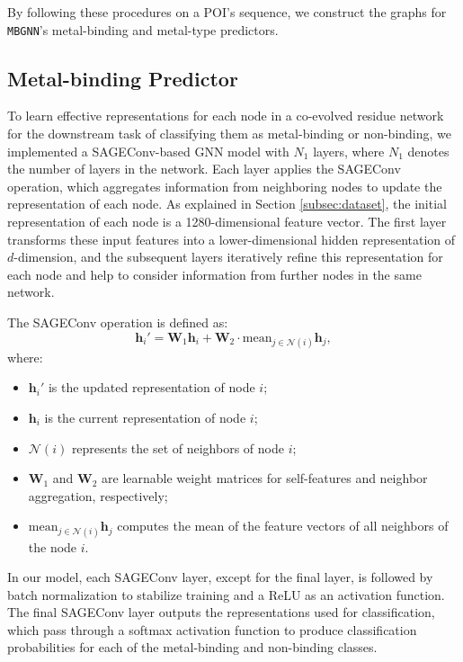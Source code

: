 \documentclass[letterpaper, 10 pt, conference]{ieeeconf}
\begin{document}
By following these procedures on a POI's sequence, we construct the graphs for \texttt{MBGNN}'s metal-binding and metal-type predictors.

\subsection{Metal-binding Predictor}
\label{subsec:mbp}
To learn effective representations for each node in a co-evolved residue network for the downstream task of classifying them as metal-binding or non-binding, we implemented a SAGEConv-based GNN model\cite{hamilton2017inductive} with $N_1$ layers, where $N_1$ denotes the number of layers in the network. Each layer applies the SAGEConv operation, which aggregates information from neighboring nodes to update the representation of each node. As explained in Section \ref{subsec:dataset}, the initial representation of each node is a 1280-dimensional feature vector. The first layer transforms these input features into a lower-dimensional hidden representation of $d$-dimension, and the subsequent layers iteratively refine this representation for each node and help to consider information from further nodes in the same network.

The SAGEConv operation is defined as:
\begin{equation}
    \mathbf{h}_i' = \mathbf{W}_1 \mathbf{h}_i + \mathbf{W}_2 \cdot \text{mean}_{j \in \mathcal{N}(i)} \mathbf{h}_j,
\end{equation}
where:  
\begin{itemize}
    \item \(\mathbf{h}_i'\) is the updated representation of node \(i\);
    \item \(\mathbf{h}_i\) is the current representation of node \(i\);  
    \item \(\mathcal{N}(i)\) represents the set of neighbors of node \(i\);
    \item \(\mathbf{W}_1\) and \(\mathbf{W}_2\) are learnable weight matrices for self-features and neighbor aggregation, respectively;
    \item \(\text{mean}_{j \in \mathcal{N}(i)} \mathbf{h}_j\) computes the mean of the feature vectors of all neighbors of the node \(i\).  
\end{itemize}

In our model, each SAGEConv layer, except for the final layer, is followed by batch normalization to stabilize training and a ReLU as an activation function. The final SAGEConv layer outputs the representations used for classification, which pass through a softmax activation function to produce classification probabilities for each of the metal-binding and non-binding classes.
\end{document}
